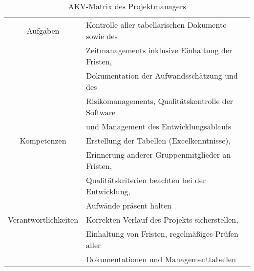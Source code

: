 \vspace{1cm}
\begin{table}[H]
    \begin{center}
        \label{tab:projektmanager}
        \begin{tabular}{c|p{9cm}}
            Aufgaben & Kontrolle aller tabellarischen Dokumente sowie des \\
            & Zeitmanagements inklusive Einhaltung der Fristen, \\
            & Dokumentation der Aufwandsschätzung und des\\
            & Risikomanagements, Qualitätskontrolle der Software \\
            & und Management des Entwicklungsablaufs \\
            \hline
            Kompetenzen & Erstellung der Tabellen (Excelkenntnisse), \\
            & Erinnerung anderer Gruppenmitglieder an Fristen, \\
            & Qualitätskriterien beachten bei der Entwicklung, \\
            & Aufwände präsent halten \\
            \hline
            Verantwortlichkeiten & Korrekten Verlauf des Projekts sicherstellen, \\
            & Einhaltung von Fristen, regelmäßiges Prüfen aller  \\
            & Dokumentationen und Managementtabellen \\
        \end{tabular}
        \caption{AKV-Matrix des Projektmanagers}
    \end{center}
\end{table}
